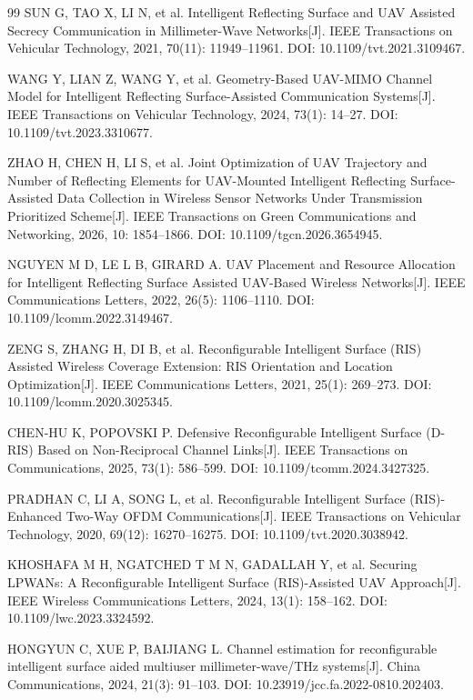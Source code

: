 \begin{thebibliography}{99}
 SUN G, TAO X, LI N, et al. Intelligent Reflecting Surface and UAV Assisted Secrecy Communication in Millimeter-Wave Networks[J]. IEEE Transactions on Vehicular Technology, 2021, 70(11): 11949--11961. DOI: 10.1109/tvt.2021.3109467.

 WANG Y, LIAN Z, WANG Y, et al. Geometry-Based UAV-MIMO Channel Model for Intelligent Reflecting Surface-Assisted Communication Systems[J]. IEEE Transactions on Vehicular Technology, 2024, 73(1): 14--27. DOI: 10.1109/tvt.2023.3310677.

 ZHAO H, CHEN H, LI S, et al. Joint Optimization of UAV Trajectory and Number of Reflecting Elements for UAV-Mounted Intelligent Reflecting Surface-Assisted Data Collection in Wireless Sensor Networks Under Transmission Prioritized Scheme[J]. IEEE Transactions on Green Communications and Networking, 2026, 10: 1854--1866. DOI: 10.1109/tgcn.2026.3654945.

 NGUYEN M D, LE L B, GIRARD A. UAV Placement and Resource Allocation for Intelligent Reflecting Surface Assisted UAV-Based Wireless Networks[J]. IEEE Communications Letters, 2022, 26(5): 1106--1110. DOI: 10.1109/lcomm.2022.3149467.

 ZENG S, ZHANG H, DI B, et al. Reconfigurable Intelligent Surface (RIS) Assisted Wireless Coverage Extension: RIS Orientation and Location Optimization[J]. IEEE Communications Letters, 2021, 25(1): 269--273. DOI: 10.1109/lcomm.2020.3025345.

 CHEN-HU K, POPOVSKI P. Defensive Reconfigurable Intelligent Surface (D-RIS) Based on Non-Reciprocal Channel Links[J]. IEEE Transactions on Communications, 2025, 73(1): 586--599. DOI: 10.1109/tcomm.2024.3427325.

 PRADHAN C, LI A, SONG L, et al. Reconfigurable Intelligent Surface (RIS)-Enhanced Two-Way OFDM Communications[J]. IEEE Transactions on Vehicular Technology, 2020, 69(12): 16270--16275. DOI: 10.1109/tvt.2020.3038942.

 KHOSHAFA M H, NGATCHED T M N, GADALLAH Y, et al. Securing LPWANs: A Reconfigurable Intelligent Surface (RIS)-Assisted UAV Approach[J]. IEEE Wireless Communications Letters, 2024, 13(1): 158--162. DOI: 10.1109/lwc.2023.3324592.

 HONGYUN C, XUE P, BAIJIANG L. Channel estimation for reconfigurable intelligent surface aided multiuser millimeter-wave/THz systems[J]. China Communications, 2024, 21(3): 91--103. DOI: 10.23919/jcc.fa.2022-0810.202403.


\end{thebibliography}
